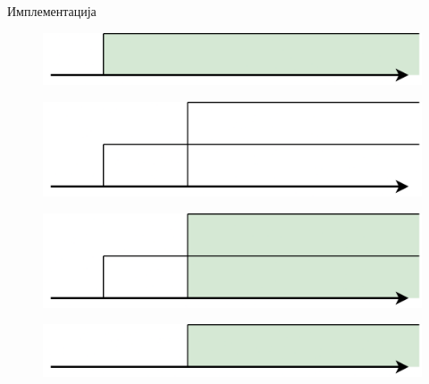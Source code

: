 \documentclass[xcolor=table]{beamer}
\begin{document}
\begin{frame}[allowframebreaks]{Имплементација}
        \framebreak
        
        \begin{figure}
            \centering
            \includegraphics[width=\textwidth,height=0.8\textheight,keepaspectratio]{images/uni_int2.png}
        \end{figure}
        
        \framebreak
        
        \begin{figure}
            \centering
            \includegraphics[width=\textwidth,height=0.8\textheight,keepaspectratio]{images/uni_int3.png}
        \end{figure}
        
        \framebreak
        
        \begin{figure}
            \centering
            \includegraphics[width=\textwidth,height=0.8\textheight,keepaspectratio]{images/uni_int4.png}
        \end{figure}
        
        \framebreak
        
        \begin{figure}
            \centering
            \includegraphics[width=\textwidth,height=0.8\textheight,keepaspectratio]{images/uni_int5.png}
        \end{figure}
        

\end{frame}
\end{document}
